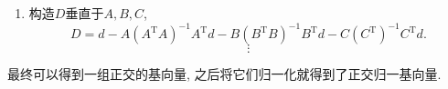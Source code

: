\begin{enumerate}
    \item 构造$D$垂直于$A,B,C$,
    \begin{equation}
      D = d - A\left( A^{\mathrm{T}}A \right) ^{-1}A^{\mathrm{T}} d - B\left( B^{\mathrm{T}}B \right) ^{-1} B^{\mathrm{T}} d - C\left( C^{\mathrm{T}} \right)^{-1}C^{\mathrm{T}} d. 
    \end{equation}
    $$
    \vdots
    $$
\end{enumerate}
最终可以得到一组正交的基向量, 之后将它们归一化就得到了正交归一基向量.